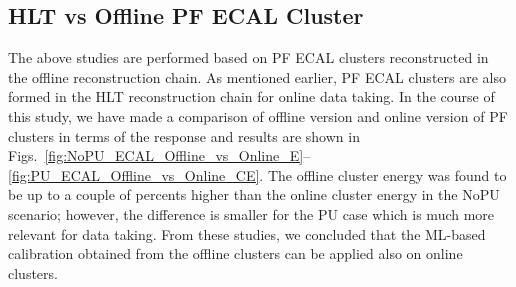\clearpage
\subsection{HLT vs Offline PF ECAL Cluster}

The above studies are performed based on PF ECAL clusters reconstructed in the offline reconstruction chain.
As mentioned earlier, PF ECAL clusters are also formed in the HLT reconstruction chain for online data taking.
In the course of this study, we have made a comparison of offline version and online version of PF clusters in terms of the response and results are shown in Figs.~\ref{fig:NoPU_ECAL_Offline_vs_Online_E}--\ref{fig:PU_ECAL_Offline_vs_Online_CE}.
The offline cluster energy was found to be up to a couple of percents higher than the online cluster energy in the NoPU scenario; however, the difference is smaller for the PU case which is much more relevant for data taking.
From these studies, we concluded that the ML-based calibration obtained from the offline clusters can be applied also on online clusters.



